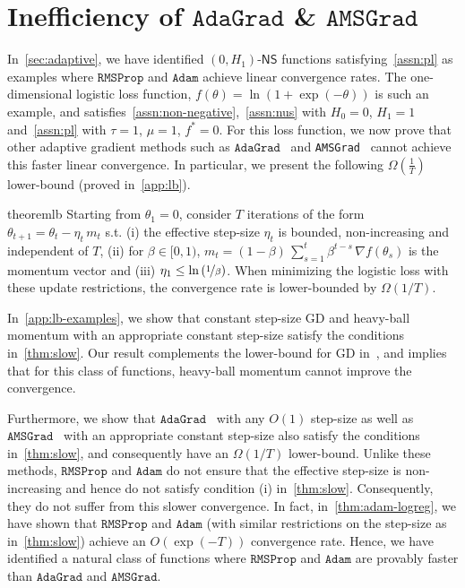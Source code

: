\documentclass{article}
\newcommand{\tht}{\theta_t}
\newcommand{\thtt}{\theta_{t+1}}
\newcommand{\etat}{{\eta_t}}
\newcommand{\RMS}{\texttt{RMSProp}}
\newcommand{\Adam}{\texttt{Adam}}
\newcommand{\AdaGrad}{\texttt{AdaGrad}}
\newcommand{\AMSGrad}{\texttt{AMSGrad}}
\newcommand{\NS}{\textsf{NS}}
\begin{document}
\section{Inefficiency of $\AdaGrad$ \& $\AMSGrad$}
\label{sec:lb}
In~\cref{sec:adaptive}, we have identified $(0, H_1)$-$\NS$ functions satisfying~\cref{assn:pl} as examples where $\RMS$ and $\Adam$ achieve linear convergence rates. The one-dimensional logistic loss function, $f(\theta) = \ln(1 + \exp(-\theta))$ is such an example, and satisfies~\cref{assn:non-negative},~\cref{assn:nus} with $H_0 = 0$, $H_1 = 1$ and~\cref{assn:pl} with $\tau = 1$, $\mu = 1$, $f^*= 0$. For this loss function, we now prove that other adaptive gradient methods such as $\AdaGrad$~\citep{duchi2011adaptive} and \texttt{AMSGrad}~\citep{reddi2019convergence} cannot achieve this faster linear convergence. In particular, we present the following $\Omega\left(\frac{1}{T}\right)$ lower-bound (proved in~\cref{app:lb}).

\begin{restatable}{theorem}{lb}
Starting from $\theta_1 = 0$, consider $T$ iterations of the form $\thtt = \tht - \etat \, m_t$ s.t. (i) the effective step-size $\etat$ is bounded, non-increasing and independent of $T$, (ii) for $\beta \in [0,1)$, $m_t = (1 - \beta) \, \sum_{s = 1}^{t} \beta^{t-s} \, \nabla f(\theta_s)$ is the momentum vector and (iii) $\eta_1 \leq \ln\left(\nicefrac{1}{\beta}\right)$. When minimizing the logistic loss with these update restrictions, the convergence rate is lower-bounded by $\Omega(1/T)$. 
\label{thm:slow}
\end{restatable}
In~\cref{app:lb-examples}, we show that constant step-size GD and heavy-ball momentum with an appropriate constant step-size satisfy the conditions in~\cref{thm:slow}. Our result complements the lower-bound for GD in~\citet{wu2024large}, and implies that for this class of functions, heavy-ball momentum cannot improve the convergence. 

Furthermore, we show that $\AdaGrad$~\citep{duchi2011adaptive} with any $O(1)$ step-size as well as $\AMSGrad$~\citep{reddi2019convergence} with an appropriate constant step-size also satisfy the conditions in~\cref{thm:slow}, and consequently have an $\Omega(1/T)$ lower-bound. Unlike these methods, $\RMS$ and $\Adam$ do not ensure that the effective step-size is non-increasing and hence do not satisfy condition (i) in~\cref{thm:slow}. Consequently, they do not suffer from this slower convergence. In fact, in~\cref{thm:adam-logreg}, we have shown that $\RMS$ and $\Adam$ (with similar restrictions on the step-size as in~\cref{thm:slow}) achieve an $O(\exp(-T))$ convergence rate. Hence, we have identified a natural class of functions where $\RMS$ and $\Adam$ are provably faster than $\AdaGrad$ and $\AMSGrad$. 
\end{document}
